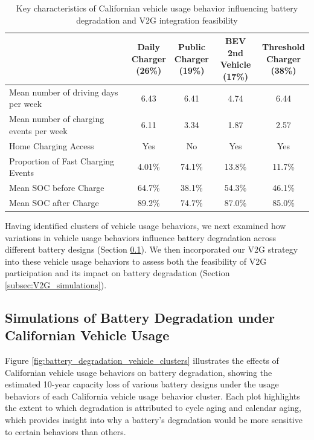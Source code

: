 \documentclass[pdflatex,sn-nature]{sn-jnl}%
\theoremstyle{thmstyleone}%
\theoremstyle{thmstyletwo}%
\theoremstyle{thmstylethree}%
\begin{document}
\begin{table}[h!]
\centering
\caption{Key characteristics of Californian vehicle usage behavior influencing battery degradation and V2G integration feasibility}
\renewcommand{\arraystretch}{1.3}
\begin{tabularx}{\textwidth}{>{\raggedright\arraybackslash}Xcccc}
\toprule
\textbf{} 
& \makecell{\textbf{Daily}\\\textbf{Charger}\\(26\%)} 
& \makecell{\textbf{Public}\\\textbf{Charger}\\(19\%)} 
& \makecell{\textbf{BEV 2nd}\\\textbf{Vehicle}\\(17\%)} 
& \makecell{\textbf{Threshold}\\\textbf{Charger}\\(38\%)} \\
\midrule
Mean number of driving days per week & 6.43 & 6.41 & 4.74 & 6.44 \\
Mean number of charging events per week & 6.11 & 3.34 & 1.87 & 2.57 \\ 
Home Charging Access & Yes & No & Yes & Yes \\
Proportion of Fast Charging Events   & 4.01\% & 74.1\% & 13.8\% & 11.7\% \\
Mean SOC before Charge & 64.7\% & 38.1\% & 54.3\% & 46.1\% \\
Mean SOC after Charge & 89.2\% & 74.7\% & 87.0\% & 85.0\% \\
\bottomrule
\end{tabularx}
\label{table:vehicle_clusters}
\end{table}

Having identified clusters of vehicle usage behaviors, we next examined how variations in vehicle usage behaviors influence battery degradation across different battery designs (Section \ref{subsec:no_V2G_simulations}). We then incorporated our V2G strategy into these vehicle usage behaviors to assess both the feasibility of V2G participation and its impact on battery degradation (Section \ref{subsec:V2G_simulations}).




\subsection{Simulations of Battery Degradation under Californian Vehicle Usage}
\label{subsec:no_V2G_simulations}

Figure \ref{fig:battery_degradation_vehicle_clusters} illustrates the effects of Californian vehicle usage behaviors on battery degradation, showing the estimated 10-year capacity loss of various battery designs under the usage behaviors of each California vehicle usage behavior cluster. Each plot highlights the extent to which degradation is attributed to cycle aging and calendar aging, which provides insight into why a battery’s degradation would be more sensitive to certain behaviors than others. 
\end{document}
